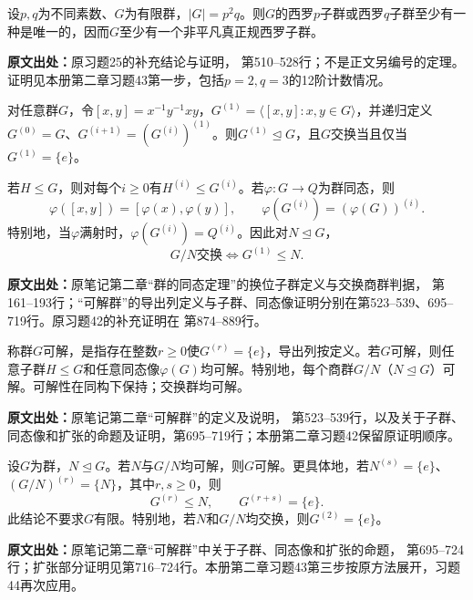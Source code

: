 \begin{reviewprop}[$p^2q$阶群存在正规西罗子群（补充）]\label{tool:a-p-square-q-normal}
设$p,q$为不同素数、$G$为有限群，$|G|=p^2q$。则$G$的西罗$p$子群或西罗$q$子群至少有一种是唯一的，因而$G$至少有一个非平凡真正规西罗子群。

\textbf{原文出处：}原习题25的补充结论与证明， 第510--528行；不是正文另编号的定理。证明见本册第二章习题43第一步，包括$p=2,q=3$的12阶计数情况。
\end{reviewprop}

\begin{reviewprop}\label{tool:a-derived-functor}
对任意群$G$，令$[x,y]=x^{-1}y^{-1}xy$，$G^{(1)}=\langle[x,y]:x,y\in G\rangle$，并递归定义$G^{(0)}=G$、$G^{(i+1)}=(G^{(i)})^{(1)}$。则$G^{(1)}\trianglelefteq G$，且$G$交换当且仅当$G^{(1)}=\{e\}$。

若$H\le G$，则对每个$i\ge0$有$H^{(i)}\le G^{(i)}$。若$\varphi:G\to Q$为群同态，则
\[
\varphi([x,y])=[\varphi(x),\varphi(y)],\qquad
\varphi(G^{(i)})=(\varphi(G))^{(i)}.
\]
特别地，当$\varphi$满射时，$\varphi(G^{(i)})=Q^{(i)}$。因此对$N\trianglelefteq G$，
\[
G/N\text{交换}\iff G^{(1)}\le N.
\]

\textbf{原文出处：}原笔记第二章“群的同态定理”的换位子群定义与交换商群判据， 第161--193行；“可解群”的导出列定义与子群、同态像证明分别在第523--539、695--719行。原习题42的补充证明在 第874--889行。
\end{reviewprop}

\begin{reviewprop}[可解群的子群与同态像]\label{tool:a-solvable-closure}
称群$G$可解，是指存在整数$r\ge0$使$G^{(r)}=\{e\}$，导出列按定义。若$G$可解，则任意子群$H\le G$和任意同态像$\varphi(G)$均可解。特别地，每个商群$G/N$（$N\trianglelefteq G$）可解。可解性在同构下保持；交换群均可解。

\textbf{原文出处：}原笔记第二章“可解群”的定义及说明， 第523--539行，以及关于子群、同态像和扩张的命题及证明，第695--719行；本册第二章习题42保留原证明顺序。
\end{reviewprop}

\begin{reviewprop}[可解群的扩张性质]\label{tool:a-solvable-extension}
设$G$为群，$N\trianglelefteq G$。若$N$与$G/N$均可解，则$G$可解。更具体地，若$N^{(s)}=\{e\}$、$(G/N)^{(r)}=\{N\}$，其中$r,s\ge0$，则
\[
G^{(r)}\le N,\qquad G^{(r+s)}=\{e\}.
\]
此结论不要求$G$有限。特别地，若$N$和$G/N$均交换，则$G^{(2)}=\{e\}$。

\textbf{原文出处：}原笔记第二章“可解群”中关于子群、同态像和扩张的命题， 第695--724行；扩张部分证明见第716--724行。本册第二章习题43第三步按原方法展开，习题44再次应用。
\end{reviewprop}

